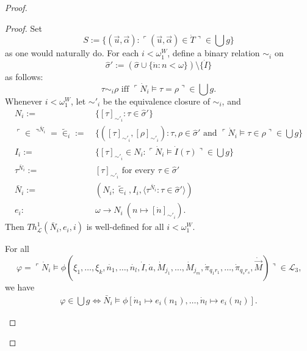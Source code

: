 \documentclass[12pt]{article}
\numberwithin{equation}{section}
\begin{document}
\begin{proof}
\begin{proof}
Set
\begin{equation*}
    S := \{(\Vec{u}, \Vec{\alpha}) : \ulcorner (\Vec{u}, \Vec{\alpha}) \in \dot{T} \urcorner \in \bigcup g\} 
\end{equation*}
as one would naturally do. For each $i < \omega_1^W$, define a binary relation $\sim_i$ on 
\begin{equation*}
    \hat{\sigma}' := (\hat{\sigma} \cup \{\dot{n} : n < \omega\}) \setminus \{\dot{I}\} 
\end{equation*}
as follows: 
\begin{equation*}
    \tau \sim_i \rho \text{ iff } \ulcorner \dot{N}_i \models \tau = \rho \urcorner \in \bigcup g \text{.}
\end{equation*}
Whenever $i < \omega_1^W$, let $\sim'_i$ be the equivalence closure of $\sim_i$, and
\begin{align*}
    N_i := \ & \{[\tau]_{\sim'_i} : \tau \in \hat{\sigma}'\} \\
    \ulcorner \in \urcorner^{\bar{N}_i} = \tilde{\in}_i := \ & \{([\tau]_{\sim'_i}, [\rho]_{\sim'_i}) : \tau, \rho \in \hat{\sigma}' \text{ and } \ulcorner \dot{N}_i \models \tau \in \rho \urcorner \in \bigcup g\} \\
    I_i := \ & \{[\tau]_{\sim'_i} \in N_i : \ulcorner \dot{N}_i \models \dot{I}(\tau) \urcorner \in \bigcup g\} \\
    \tau^{\bar{N}_i} := \ & [\tau]_{\sim'_i} \text{ for every } \tau \in \hat{\sigma}' \\
    \bar{N}_i := \ & (N_i; \tilde{\in}_i, I_i, \langle \tau^{\bar{N}_i} : \tau \in \hat{\sigma}' \rangle) \\
    e_i : \ & \omega \longrightarrow N_i \ (n \mapsto [\dot{n}]_{\sim'_i}) \text{.}
\end{align*}
Then $Th^{1}_{\mathcal{L}}(\bar{N}_i, e_i, i)$ is well-defined for all $i < \omega_1^W$.

\begin{prop}\label{prop448}
For all
\begin{equation*}
    \varphi = \ulcorner \dot{N}_i \models \phi(\xi_1, \ldots, \xi_k, \dot{n_1}, \ldots, \dot{n_l}, \dot{I}, \dot{a}, \dot{M}_{j_1}, \ldots, \dot{M}_{j_m}, \dot{\pi}_{q_{1}r_{1}}, \ldots, \dot{\pi}_{q_{s}r_{s}}, \dot{\Vec{M}}) \urcorner \in \mathcal{L}_3 \text{,}
\end{equation*}
we have
\begin{gather*}
    \varphi \in \bigcup g \iff \bar{N}_i \models \phi[\dot{n}_1 \mapsto e_i(n_1), \ldots, \dot{n}_l \mapsto e_i(n_l)] \text{.}
\end{gather*}
\end{prop}


\end{proof}
\end{proof}
\end{document}
